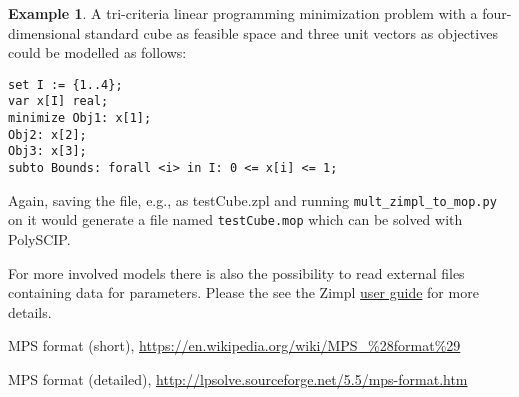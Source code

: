 \documentclass[11pt,listof=totoc]{scrartcl}
\theoremstyle{definition}
\newtheorem{ex}{Example}[section]
\begin{document}
\begin{ex}A tri-criteria linear programming minimization problem with a four-dimensional standard cube as feasible space and three unit vectors as objectives could be modelled as follows:
\begin{verbatim}
set I := {1..4};
var x[I] real;
minimize Obj1: x[1];
Obj2: x[2];
Obj3: x[3];
subto Bounds: forall <i> in I: 0 <= x[i] <= 1;
\end{verbatim}
Again, saving the file, e.g., as testCube.zpl and running \texttt{mult\_zimpl\_to\_mop.py} on it would generate a file named \texttt{testCube.mop} which can be solved with PolySCIP. 
\end{ex}

For more involved models there is also the possibility to read
external files containing data for parameters. Please the see the
Zimpl \href{http://zimpl.zib.de/download/zimpl.pdf}{user guide} for
more details.

\begin{thebibliography}{}
 MPS format (short), 
  \url{https://en.wikipedia.org/wiki/MPS_%28format%29}

 MPS format (detailed),
  \url{http://lpsolve.sourceforge.net/5.5/mps-format.htm}
\end{thebibliography}
\end{document}
